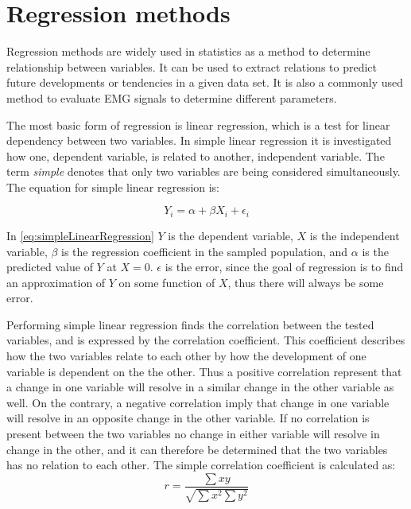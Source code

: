 \section{Regression methods} \label{sec:regression}

	

Regression methods are widely used in statistics as a method to determine relationship between variables. It can be used to extract relations to predict future developments or tendencies in a given data set. It is also a commonly used method to evaluate EMG signals to determine different parameters. 

The most basic form of regression is linear regression, which is a test for linear dependency between two variables. In simple linear regression it is investigated how one, dependent variable, is related to another, independent variable. The term \textit{simple} denotes that only two variables are being considered simultaneously. The equation for simple linear regression is: \cite{zar2009}

\begin{equation} \label{eq:simpleLinearRegression}
Y_i = \alpha + \beta X_i + \epsilon_i
\end{equation}

In \eqref{eq:simpleLinearRegression} $Y$ is the dependent variable, $X$ is the independent variable, $\beta$ is the regression coefficient in the sampled population, and $\alpha$ is the predicted value of $Y$ at $X = 0$. $\epsilon$ is the error, since the goal of regression is to find an approximation of $Y$ on some function of $X$, thus there will always be some error.

Performing simple linear regression finds the correlation between the tested variables, and is expressed by the correlation coefficient. This coefficient describes how the two variables relate to each other by how the development of one variable is dependent on the the other. Thus a positive correlation represent that a change in one variable will resolve in a similar change in the other variable as well. On the contrary, a negative correlation imply that change in one variable will resolve in an opposite change in the other variable. If no correlation is present between the two variables no change in either variable will resolve in change in the other, and it can therefore be determined that the two variables has no relation to each other. \cite{zar2009}
The simple correlation coefficient is calculated as: \cite{zar2009}
\begin{equation}
r = \frac{\sum xy}{\sqrt{\sum x^{2} \sum y^{2}}}
\end{equation}

